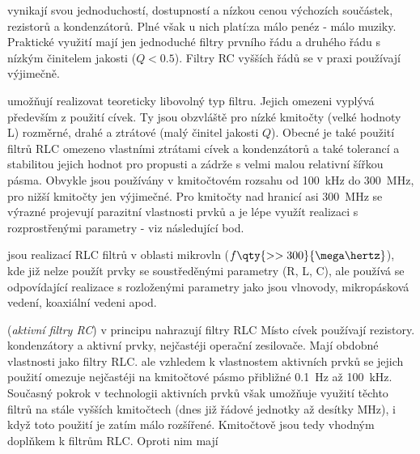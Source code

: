       \begin{description}[noitemsep, font=\small]
        \item[\textbf{Filtry RC}] vynikají svou jednoduchostí, dostupností a nízkou cenou výchozích
              součástek, rezistorů a kondenzátorů. Plné však u nich platí:za málo penéz - málo
              muziky. Praktické využití mají jen jednoduché filtry prvního řádu a druhého řádu s
              nízkým činitelem jakosti (\(Q < \num{0.5}\)). Filtry RC vyšších řádů se v praxi
              používají výjimečně.
        \item[\textbf{Filtry RLC}] umožňují realizovat teoreticky libovolný typ filtru. Jejich
              omezeni vyplývá především z použití cívek. Ty jsou obzvláště pro nízké kmitočty
              (velké hodnoty L) rozměrné, drahé a ztrátové (malý činitel jakosti \(Q\)). Obecné je
              také použití filtrů RLC omezeno vlastními ztrátami cívek a kondenzátorů a také
              tolerancí a stabilitou jejich hodnot pro propusti a zádrže s velmi malou relativní
              šířkou pásma. Obvykle jsou používány v kmitočtovém rozsahu od \qty{100}{\kilo\hertz}
              do \qty{300}{\mega\hertz}, pro nižší kmitočty jen výjimečné. Pro kmitočty nad
              hranicí asi \qty{300}{\mega\hertz} se výrazné projevují parazitní vlastnosti prvků a
              je lépe využít realizaci s rozprostřenými parametry - viz následující bod.
        \item[\textbf{Mikrovlnné filtry}] jsou realizací RLC filtrů v oblasti mikrovln (\(f
              \qty{>>300}{\mega\hertz}\)), kde již nelze použít prvky se soustředěnými parametry
              (R, L, C), ale používá se odpovídající realizace s rozloženými parametry jako jsou
              vlnovody, mikropásková vedení, koaxiální vedeni apod.
        \item[\textbf{Filtry ARC}] (\emph{aktivní filtry RC}) v principu nahrazují filtry RLC
              Místo cívek používají rezistory. kondenzátory a aktivní prvky, nejčastéji operační
              zesilovače. Mají obdobné vlastnosti jako filtry RLC. ale vzhledem k vlastnostem
              aktivních prvků se jejich použití omezuje nejčastéji na kmitočtové pásmo přibližné
              \qty{0.1}{\hertz} až \qty{100}{\kilo\hertz}. Současný pokrok v technologii aktivních
              prvků však umožňuje využití těchto filtrů na stále vyšších kmitočtech (dnes již
              řádové jednotky až desítky \unit{\mega\hertz}), i když toto použití je zatím málo
              rozšířené. Kmitočtově jsou tedy vhodným doplňkem k filtrům RLC. Oproti nim mají

\end{description}
